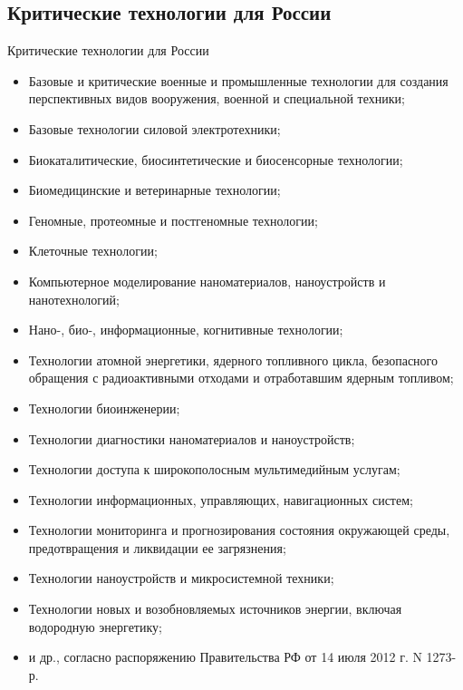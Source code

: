 \documentclass[_Venture_p1.tex]{subfiles}
\begin{document}
\subsection{Критические технологии для России}
\begin{frame}[allowframebreaks]{Критические технологии для России}
\begin{itemize}
	\item Базовые и критические военные и промышленные технологии для создания перспективных видов вооружения, военной и специальной техники;
	\item Базовые технологии силовой электротехники;
	\item Биокаталитические, биосинтетические и биосенсорные технологии;
	\item Биомедицинские и ветеринарные технологии;
	
	\pagebreak
	\item Геномные, протеомные и постгеномные технологии;
	\item Клеточные технологии;
	\item Компьютерное моделирование наноматериалов, наноустройств и нанотехнологий;
	\item Нано-, био-, информационные, когнитивные технологии;
	\pagebreak
	\item Технологии атомной энергетики, ядерного топливного цикла, безопасного обращения с радиоактивными отходами и отработавшим ядерным топливом;
	\item Технологии биоинженерии;
	\item Технологии диагностики наноматериалов и наноустройств;
	
	\pagebreak
	\item Технологии доступа к широкополосным мультимедийным услугам;
	\item Технологии информационных, управляющих, навигационных систем;
	\item Технологии мониторинга и прогнозирования состояния окружающей среды, предотвращения и ликвидации ее загрязнения;
	\pagebreak
	\item Технологии наноустройств и микросистемной техники;
	\item Технологии новых и возобновляемых источников энергии, включая водородную энергетику;
	\item и др., согласно распоряжению Правительства РФ от 14 июля 2012 г. N 1273-р. 
\end{itemize}
\end{frame}
\end{document}
